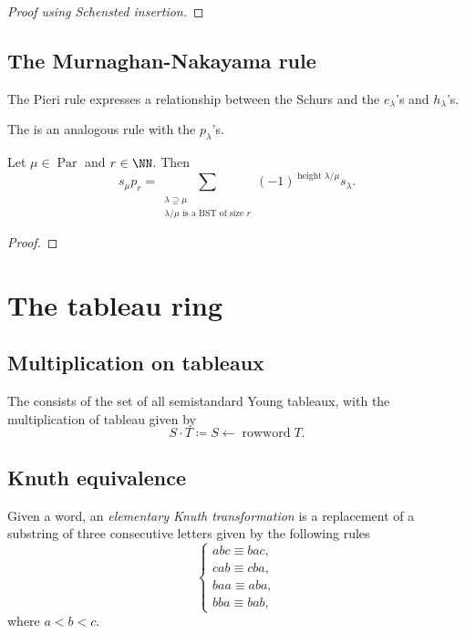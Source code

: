 \documentclass{article}
\DeclareMathOperator{\opheight}{height}
\DeclareMathOperator{\rowword}{rowword}
\DeclareMathOperator{\Par}{Par}
\begin{document}
\begin{proof}
    [Proof using Schensted insertion]
\end{proof}




\subsection{The Murnaghan-Nakayama rule}

The Pieri rule expresses a relationship between the Schurs and the $e_\lambda$'s and $h_\lambda$'s.

The  is an analogous rule with the $p_\lambda$'s.


\begin{theorem} 
    Let $\mu \in \Par$ and $r \in \NN$.
    Then
    \[
        s_\mu p_r = \sum_{\substack{\lambda\supseteq\mu \\ \lambda / \mu \text{ is a BST of size }r}}(-1)^{\opheight \lambda / \mu} s_\lambda.
    \]
\end{theorem}

\begin{proof}
\end{proof}

\section{The tableau ring}

\subsection{Multiplication on tableaux}

\begin{definition}
    The  consists of the set of all semistandard Young tableaux, with the multiplication of tableau given by
    \[
        S \cdot T
        \coloneq
        S \leftarrow \rowword T.
    \]
\end{definition}


\subsection{Knuth equivalence}

\begin{definition}
    Given a word, an \textit{elementary Knuth transformation} is a replacement of a substring of three consecutive letters given by the following rules
    \[
        \begin{cases}
            abc \equiv bac, \\
            cab \equiv cba, \\
            baa \equiv aba, \\
            bba \equiv bab,
        \end{cases}
    \]
    where $a < b < c$.
\end{definition}
\end{document}
